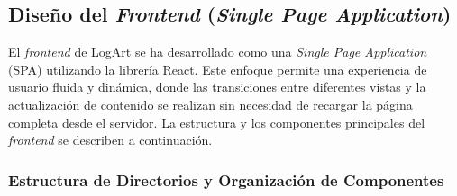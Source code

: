 \subsection{Diseño del \textit{Frontend} (\textit{Single Page Application})}
\label{ssec:disenoFrontend}

El \textit{frontend} de LogArt se ha desarrollado como una \textit{Single Page Application} (SPA) utilizando la librería React. Este enfoque permite una experiencia de usuario fluida y dinámica, donde las transiciones entre diferentes vistas y la actualización de contenido se realizan sin necesidad de recargar la página completa desde el servidor. La estructura y los componentes principales del \textit{frontend} se describen a continuación.

\subsubsection{Estructura de Directorios y Organización de Componentes}
\label{sssec:estructuraFrontend}


